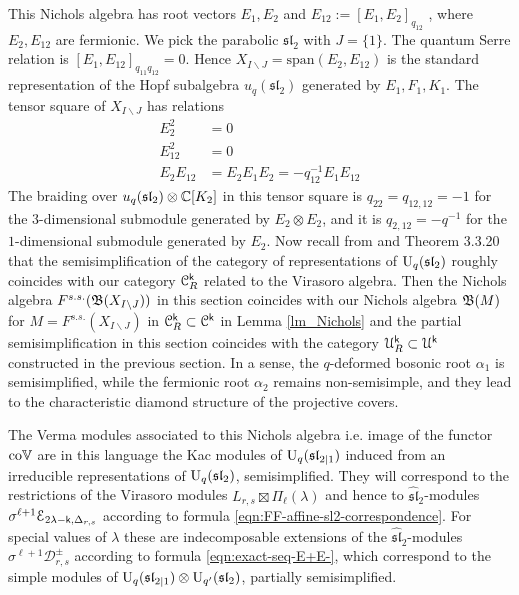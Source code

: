 \documentclass[a4paper, reqno]{amsart}
\theoremstyle{introTheorems}
\newcommand\cC{\mathcal{C}}
\newcommand\cU{\mathcal{U}}
\renewcommand\sl{\mathfrak{sl}}
\renewcommand{\1}{\mathbbold{1}}
\begin{document}
This Nichols algebra has root vectors $E_1,E_2$ and $E_{12}:=[E_1,E_2]_{q_{12}}$ , where $E_2,E_{12}$ are fermionic. We pick the parabolic $\sl_2$ with $J=\{1\}$. The quantum Serre relation is $[E_1,E_{12}]_{q_{11}q_{12}}=0$. Hence $X_{I\backslash J}=\mathrm{span}(E_2,E_{12})$ is the standard representation of the Hopf subalgebra $u_q(\sl_2)$ generated by $E_1,F_1,K_1$. The tensor square of $X_{I\backslash J}$ has relations 
\begin{align*}
E_2^2&=0 \\
E_{12}^2&=0 \\
E_2E_{12} &= E_2E_1E_2 = -q_{12}^{-1} E_1E_{12}
\end{align*}
The braiding over $u_q(\sl_2)\otimes \C[K_2]$ in this tensor square is 
$q_{22}=q_{12,12}=-1$ for the $3$-dimensional submodule generated by $E_2\otimes E_2$, and it is $q_{2,12}=-q^{-1}$ for the $1$-dimensional submodule generated by $E_2$. Now recall from \cites{AP95} and \cite{BK01} Theorem 3.3.20 that the semisimplification of the category of representations of $\Uq(\sl_2)$ roughly coincides with our category
$\cC^\k_R$ related to the Virasoro algebra. Then the Nichols algebra $F^{s.s.}(\mathfrak{B}(X_{I\backslash J} ))$ in this section coincides with our Nichols algebra $\mathfrak{B}(M)$ for $M=F^{s.s.}(X_{I\backslash J})$ in $\cC^\k_R\subset \cC^\k$ in Lemma \ref{lm_Nichols} and the partial semisimplification in this section coincides with the category $\cU^\k_R\subset \cU^\k$ constructed in the previous section. In a sense, the $q$-deformed bosonic root $\alpha_1$ is semisimplified, while the fermionic root $\alpha_2$ remains non-semisimple, and they lead to the characteristic diamond structure of the projective covers.

The Verma modules associated to this Nichols algebra i.e. image of the functor $\mathrm{co}\mathbb{V}$ are in this language the Kac modules of $\Uq(\sl_{2|1})$ induced from an irreducible representations of $\Uq(\sl_2)$, semisimplified. They will correspond to the restrictions of the Virasoro modules $L_{r,s}\boxtimes\Pi_\ell(\lambda)$ and hence to $\widehat{\sl}_2$-modules $\sigma^{\ell+1}\mathcal{E}_{2\lambda-\mathsf{k},\Delta_{r,s}}$ according to formula \eqref{eqn:FF-affine-sl2-correspondence}. For special values of $\lambda$ these are indecomposable extensions of the $\widehat{\sl}_2$-modules $\sigma^{\ell+1}\mathcal{D}_{r,s}^\pm$ according to formula \eqref{eqn:exact-seq-E+E-}, which correspond to the simple modules of $\Uq(\sl_{2|1})\otimes \mathrm{U}_{q'}(\sl_2)$, partially semisimplified.
\end{document}
